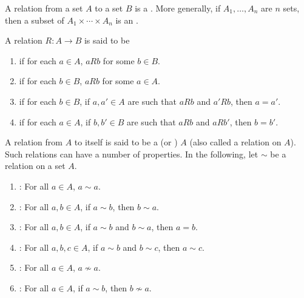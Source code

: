 \begin{Note*}
A relation from a set $A$ to a set $B$ is a . More generally, if $A_1, \ldots, A_n$ are $n$ sets, then a subset of $A_1 \times \cdots \times A_n$ is an .
\end{Note*}

A relation $R \colon A \to B$ is said to be
\begin{enumerate}
\item {} if for each $a \in A$, $aRb$ for some $b \in B$.
\item {} if for each $b \in B$, $aRb$ for some $a \in A$.
\item {} if for each $b \in B$, if $a, a' \in A$ are such that $aRb$ and $a'Rb$, then $a = a'$.
\item {} if for each $a \in A$, if $b, b' \in B$ are such that $aRb$ and $aRb'$, then $b = b'$.
\end{enumerate}

A relation from $A$ to itself is said to be a  (or ) $A$ (also called a  relation on $A$). Such relations can have a number of properties. In the following, let $\sim$ be a relation on a set $A$.
\begin{enumerate}
\item {}: For all $a \in A$, $a \sim a$.
\item {}: For all $a, b \in A$, if $a \sim b$, then $b \sim a$.
\item {}: For all $a, b \in A$, if $a \sim b$ and $b \sim a$, then $a = b$.
\item {}: For all $a, b, c \in A$, if $a \sim b$ and $b \sim c$, then $a \sim c$.
\item {}: For all $a \in A$, $a \not\sim a$.
\item {}: For all $a \in A$, if $a \sim b$, then $b \not\sim a$.
\end{enumerate}

